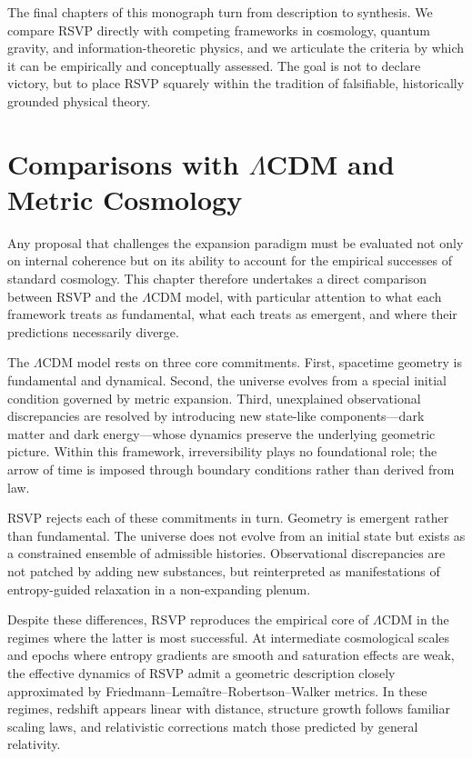 \documentclass[11pt,oneside]{book}
\begin{document}
The final chapters of this monograph turn from description to synthesis. We compare RSVP directly with competing frameworks in cosmology, quantum gravity, and information-theoretic physics, and we articulate the criteria by which it can be empirically and conceptually assessed. The goal is not to declare victory, but to place RSVP squarely within the tradition of falsifiable, historically grounded physical theory.

\chapter{Comparisons with \(\Lambda\)CDM and Metric Cosmology}

Any proposal that challenges the expansion paradigm must be evaluated not only on internal coherence but on its ability to account for the empirical successes of standard cosmology. This chapter therefore undertakes a direct comparison between RSVP and the \(\Lambda\)CDM model, with particular attention to what each framework treats as fundamental, what each treats as emergent, and where their predictions necessarily diverge.

The \(\Lambda\)CDM model rests on three core commitments. First, spacetime geometry is fundamental and dynamical. Second, the universe evolves from a special initial condition governed by metric expansion. Third, unexplained observational discrepancies are resolved by introducing new state-like components—dark matter and dark energy—whose dynamics preserve the underlying geometric picture. Within this framework, irreversibility plays no foundational role; the arrow of time is imposed through boundary conditions rather than derived from law.

RSVP rejects each of these commitments in turn. Geometry is emergent rather than fundamental. The universe does not evolve from an initial state but exists as a constrained ensemble of admissible histories. Observational discrepancies are not patched by adding new substances, but reinterpreted as manifestations of entropy-guided relaxation in a non-expanding plenum.

Despite these differences, RSVP reproduces the empirical core of \(\Lambda\)CDM in the regimes where the latter is most successful. At intermediate cosmological scales and epochs where entropy gradients are smooth and saturation effects are weak, the effective dynamics of RSVP admit a geometric description closely approximated by Friedmann–Lemaître–Robertson–Walker metrics. In these regimes, redshift appears linear with distance, structure growth follows familiar scaling laws, and relativistic corrections match those predicted by general relativity.
\end{document}
